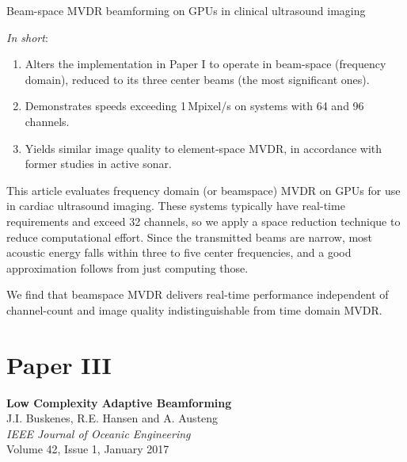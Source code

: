 Beam-space MVDR beamforming on GPUs in clinical ultrasound imaging

\textit{In short}:
\begin{enumerate}
\item Alters the implementation in Paper I to operate in beam-space (frequency domain), reduced to its three center beams (the most significant ones).
\item Demonstrates speeds exceeding 1\,Mpixel/s on systems with 64 and 96 channels.
\item Yields similar image quality to element-space MVDR, in accordance with former studies in active sonar.
\end{enumerate}

This article evaluates frequency domain (or beamspace) MVDR on GPUs for use in cardiac ultrasound imaging. These systems typically have real-time requirements and exceed 32 channels, so we apply a space reduction technique to reduce computational effort. Since the transmitted beams are narrow, most acoustic energy falls within three to five center frequencies, and a good approximation follows from just computing those.

We find that beamspace MVDR delivers real-time performance independent of channel-count and image quality indistinguishable from time domain MVDR.


%
%


\section{Paper III}\label{sec:paperIII} %
\textbf{Low Complexity Adaptive Beamforming}~\cite{Buskenes2016}\\
J.I. Buskenes, R.E. Hansen and A. Austeng\\
\textit{IEEE Journal of Oceanic Engineering}\\
Volume 42, Issue 1, January 2017

